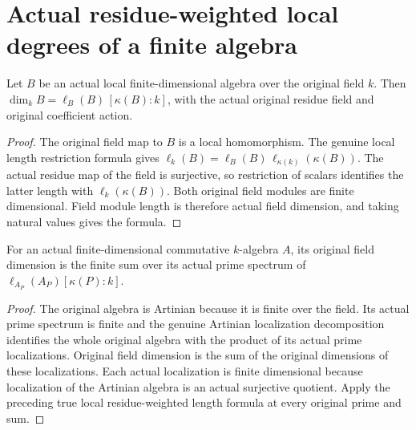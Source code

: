 \section{Actual residue-weighted local degrees of a finite algebra}

\begin{theorem}
\label{thm:fc-finite-algebra-local-degree}
\leanok
{}
Let $B$ be an actual local finite-dimensional algebra over the original
field $k$. Then
$\dim_k B=\ell_B(B)\,[\kappa(B):k]$, with the actual original residue
field and original coefficient action.
\end{theorem}
\begin{proof}
The original field map to $B$ is a local homomorphism. The genuine local
length restriction formula gives
$\ell_k(B)=\ell_B(B)\,\ell_{\kappa(k)}(\kappa(B))$.
The actual residue map of the field is surjective, so restriction of
scalars identifies the latter length with $\ell_k(\kappa(B))$.
Both original field modules are finite dimensional. Field module length
is therefore actual field dimension, and taking natural values gives
the formula.
\end{proof}

\begin{theorem}
\label{thm:fc-finite-algebra-degree-sum}
\leanok
{}
For an actual finite-dimensional commutative $k$-algebra $A$, its
original field dimension is the finite sum over its actual prime
spectrum of
$\ell_{A_P}(A_P)[\kappa(P):k]$.
\end{theorem}
\begin{proof}
The original algebra is Artinian because it is finite over the field.
Its actual prime spectrum is finite and the genuine Artinian
localization decomposition identifies the whole original algebra
with the product of its actual prime localizations. Original field
dimension is the sum of the original dimensions of these localizations.
Each actual localization is finite dimensional because localization
of the Artinian algebra is an actual surjective quotient. Apply the
preceding true local residue-weighted length formula at every original
prime and sum.
\end{proof}

